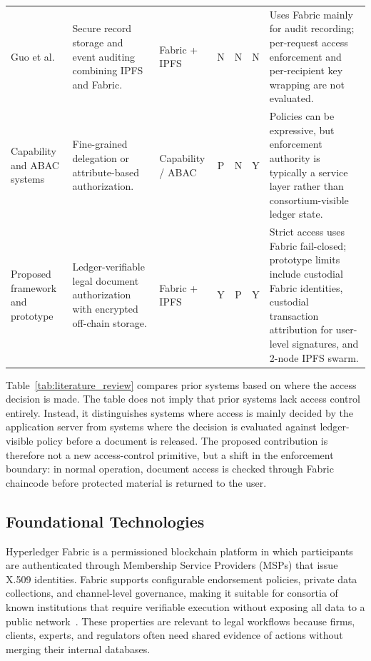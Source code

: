 \documentclass{ieeeaccess}
\begin{document}
\begin{table}[!t]
\begin{tabularx}{\textwidth}{@{}
>{\raggedright\arraybackslash}p{2.3cm}
>{\raggedright\arraybackslash}p{3.3cm}
>{\raggedright\arraybackslash}p{2.2cm}
c c c
>{\raggedright\arraybackslash}X
@{}}
Guo et al.~\cite{guo2024efficient} &
Secure record storage and event auditing combining IPFS and Fabric. &
Fabric + IPFS &
N & N & N &
Uses Fabric mainly for audit recording; per-request access enforcement and per-recipient key wrapping are not evaluated. \\

Capability and ABAC systems~\cite{macaroons2014,zanzibar2019,qian2021cpabe} &
Fine-grained delegation or attribute-based authorization. &
Capability / ABAC &
P & N & Y &
Policies can be expressive, but enforcement authority is typically a service layer rather than consortium-visible ledger state. \\

Proposed framework and prototype &
Ledger-verifiable legal document authorization with encrypted off-chain storage. &
Fabric + IPFS &
Y & P & Y &
Strict access uses Fabric fail-closed; prototype limits include custodial Fabric identities, custodial transaction attribution for user-level signatures, and 2-node IPFS swarm. \\

\bottomrule
\end{tabularx}
\normalsize
\end{table}


Table~\ref{tab:literature_review} compares prior systems based on
where the access decision is made. The table does not imply that prior
systems lack access control entirely. Instead, it distinguishes systems
where access is mainly decided by the application server from systems
where the decision is evaluated against ledger-visible policy before a
document is released. The proposed contribution is therefore not a new
access-control primitive, but a shift in the enforcement boundary: in
normal operation, document access is checked through Fabric chaincode
before protected material is returned to the user.

\subsection{Foundational Technologies}
\label{sec:foundations}

Hyperledger Fabric is a permissioned blockchain platform in which
participants are authenticated through Membership Service Providers
(MSPs) that issue X.509 identities. Fabric supports configurable
endorsement policies, private data collections, and channel-level
governance, making it suitable for consortia of known institutions
that require verifiable execution without exposing all data to a
public network~\cite{androulaki2018hyperledger,fabricMSP,
fabricPDCDoc,fabricEndorsementDoc}. These properties are relevant to
legal workflows because firms, clients, experts, and regulators often
need shared evidence of actions without merging their internal
databases.
\end{document}
